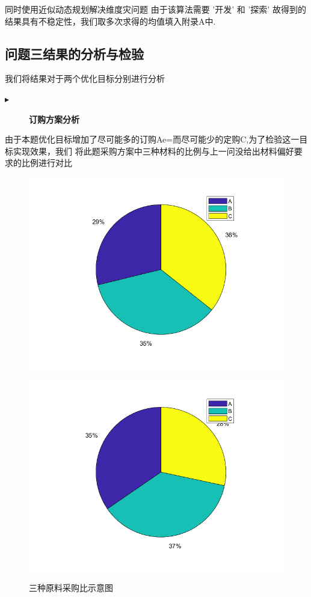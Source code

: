 \documentclass[withoutpreface,bwprint]{cumcmthesis}
\begin{document}
同时使用近似动态规划解决维度灾问题
由于该算法需要 '开发' 和 '探索' 故得到的结果具有不稳定性，我们取多次求得的均值填入附录A中.
\subsection{问题三结果的分析与检验}
我们将结果对于两个优化目标分别进行分析
\begin{description}
    \item[$\blacktriangleright$] \textbf{订购方案分析}
\end{description} 
由于本题优化目标增加了尽可能多的订购Ae=而尽可能少的定购C,为了检验这一目标实现效果，我们
将此题采购方案中三种材料的比例与上一问没给出材料偏好要求的比例进行对比
\begin{figure}[H]
    \centering
    \begin{minipage}[c]{0.4\textwidth}
        \centering
        \includegraphics[width=1\textwidth]{before_edit.png}
        \label{fig:sample-figure-a}
    \end{minipage}
    \begin{minipage}[c]{0.4\textwidth}
        \centering
        \includegraphics[width=1\textwidth]{after_edit.png}
        \label{fig:sample-figure-b}
    \end{minipage}
    \caption{三种原料采购比示意图}
    \label{fig:sample-figure}
\end{figure}
\end{document}
